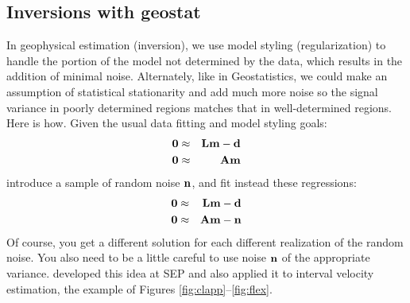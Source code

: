 \subsection{Inversions with geostat}
In geophysical estimation (inversion),
we use model styling
(regularization) to handle the portion of the model not determined by the data,
which results in the addition of minimal noise.
Alternately, like in Geostatistics,
we could make an assumption of statistical stationarity
and add much more noise so the signal variance in poorly determined
regions matches that in well-determined regions.
Here is how.
Given the usual data fitting and model styling goals:
\begin{eqnarray}
\bold 0 &\approx& \bold L \bold m -\bold d
\\
\bold 0 &\approx& \bold A \bold m
\end{eqnarray} 
introduce a sample of random noise $\bold n$, and fit instead
these regressions:
\begin{eqnarray}
\bold 0 &\approx& \bold L \bold m -\bold d
\\
\bold 0 &\approx& \bold A \bold m -\bold n
\end{eqnarray}
Of course, you get a different solution for each different
realization of the random noise.
You also need to be a little careful to use noise $\bold n$
of the appropriate variance.
 developed this idea at SEP and also
applied it to interval velocity estimation,
the example of Figures \ref{fig:clapp}--\ref{fig:flex}.


